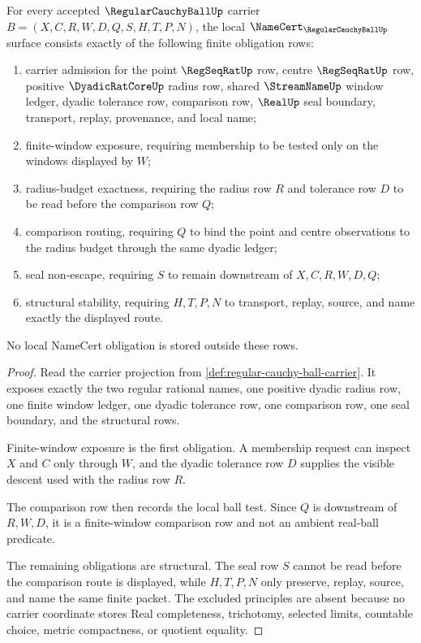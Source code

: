 \begin{theorem}
\label{thm:regular-cauchy-ball-namecert-obligations}
For every accepted $\RegularCauchyBallUp$ carrier $B=(X,C,R,W,D,Q,S,H,T,P,N)$, the local $\NameCert_{\RegularCauchyBallUp}$ surface consists exactly of the following finite obligation rows:
\begin{enumerate}
\item carrier admission for the point $\RegSeqRatUp$ row, centre $\RegSeqRatUp$ row, positive $\DyadicRatCoreUp$ radius row, shared $\StreamNameUp$ window ledger, dyadic tolerance row, comparison row, $\RealUp$ seal boundary, transport, replay, provenance, and local name;
\item finite-window exposure, requiring membership to be tested only on the windows displayed by $W$;
\item radius-budget exactness, requiring the radius row $R$ and tolerance row $D$ to be read before the comparison row $Q$;
\item comparison routing, requiring $Q$ to bind the point and centre observations to the radius budget through the same dyadic ledger;
\item seal non-escape, requiring $S$ to remain downstream of $X,C,R,W,D,Q$;
\item structural stability, requiring $H,T,P,N$ to transport, replay, source, and name exactly the displayed route.
\end{enumerate}
No local NameCert obligation is stored outside these rows.
\end{theorem}
\begin{proof}
Read the carrier projection from \autoref{def:regular-cauchy-ball-carrier}. It exposes exactly the two regular rational names, one positive dyadic radius row, one finite window ledger, one dyadic tolerance row, one comparison row, one seal boundary, and the structural rows.

Finite-window exposure is the first obligation. A membership request can inspect $X$ and $C$ only through $W$, and the dyadic tolerance row $D$ supplies the visible descent used with the radius row $R$.

The comparison row then records the local ball test. Since $Q$ is downstream of $R,W,D$, it is a finite-window comparison row and not an ambient real-ball predicate.

The remaining obligations are structural. The seal row $S$ cannot be read before the comparison route is displayed, while $H,T,P,N$ only preserve, replay, source, and name the same finite packet. The excluded principles are absent because no carrier coordinate stores Real completeness, trichotomy, selected limits, countable choice, metric compactness, or quotient equality.
\end{proof}

